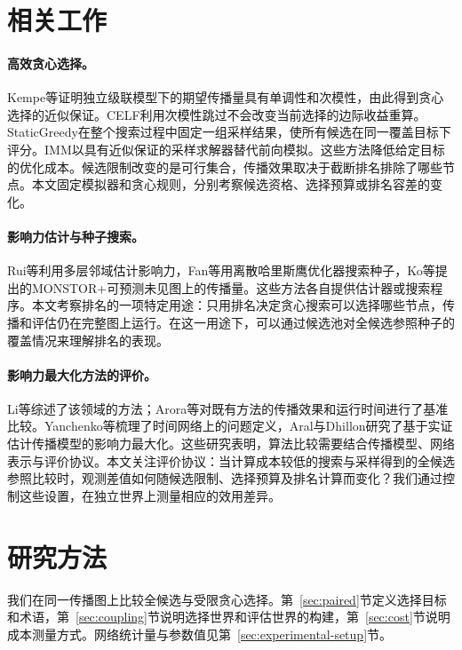 \documentclass[smallextended]{svjour3}
\begin{document}
\section{相关工作}
\paragraph{高效贪心选择。}Kempe等证明独立级联模型下的期望传播量具有单调性和次模性，由此得到贪心选择的近似保证\cite{ref1}。CELF利用次模性跳过不会改变当前选择的边际收益重算\cite{ref7}。StaticGreedy在整个搜索过程中固定一组采样结果，使所有候选在同一覆盖目标下评分\cite{ref8}。IMM以具有近似保证的采样求解器替代前向模拟\cite{ref2}。这些方法降低给定目标的优化成本。候选限制改变的是可行集合，传播效果取决于截断排名排除了哪些节点。本文固定模拟器和贪心规则，分别考察候选资格、选择预算或排名容差的变化。

\paragraph{影响力估计与种子搜索。}Rui等利用多层邻域估计影响力\cite{ref12}，Fan等用离散哈里斯鹰优化器搜索种子\cite{ref13}，Ko等提出的MONSTOR+可预测未见图上的传播量\cite{ref19}。这些方法各自提供估计器或搜索程序。本文考察排名的一项特定用途：只用排名决定贪心搜索可以选择哪些节点，传播和评估仍在完整图上运行。在这一用途下，可以通过候选池对全候选参照种子的覆盖情况来理解排名的表现。

\paragraph{影响力最大化方法的评价。}Li等综述了该领域的方法\cite{ref9}；Arora等对既有方法的传播效果和运行时间进行了基准比较\cite{ref16}。Yanchenko等梳理了时间网络上的问题定义\cite{ref11}，Aral与Dhillon研究了基于实证估计传播模型的影响力最大化\cite{ref15}。这些研究表明，算法比较需要结合传播模型、网络表示与评价协议。本文关注评价协议：当计算成本较低的搜索与采样得到的全候选参照比较时，观测差值如何随候选限制、选择预算及排名计算而变化？我们通过控制这些设置，在独立世界上测量相应的效用差异。

\section{研究方法}
我们在同一传播图上比较全候选与受限贪心选择。第~\ref{sec:paired}节定义选择目标和术语，第~\ref{sec:coupling}节说明选择世界和评估世界的构建，第~\ref{sec:cost}节说明成本测量方式。网络统计量与参数值见第~\ref{sec:experimental-setup}节。
\end{document}
